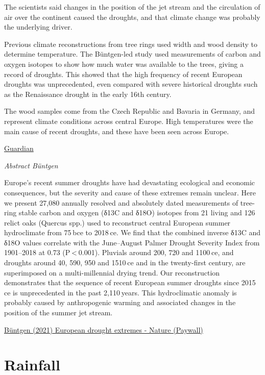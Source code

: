 \documentclass[
]{book}
\begin{document}
The scientists said changes in the position of the jet stream and the circulation of air over the continent caused the droughts, and that climate change was probably the underlying driver.

Previous climate reconstructions from tree rings used width and wood density to determine temperature. The Büntgen-led study used measurements of carbon and oxygen isotopes to show how much water was available to the trees, giving a record of droughts. This showed that the high frequency of recent European droughts was unprecedented, even compared with severe historical droughts such as the Renaissance drought in the early 16th century.

The wood samples come from the Czech Republic and Bavaria in Germany, and represent climate conditions across central Europe. High temperatures were the main cause of recent droughts, and these have been seen across Europe.

\href{https://www.theguardian.com/environment/2021/mar/15/climate-crisis-recent-european-droughts-worst-in-2000-years}{Guardian}

\emph{Abstract Büntgen}

Europe's recent summer droughts have had devastating ecological and economic consequences, but the severity and cause of these extremes remain unclear. Here we present 27,080 annually resolved and absolutely dated measurements of tree-ring stable carbon and oxygen (δ13C and δ18O) isotopes from 21 living and 126 relict oaks (Quercus spp.) used to reconstruct central European summer hydroclimate from 75 bce to 2018 ce. We find that the combined inverse δ13C and δ18O values correlate with the June--August Palmer Drought Severity Index from 1901--2018 at 0.73 (P \textless{} 0.001). Pluvials around 200, 720 and 1100 ce, and droughts around 40, 590, 950 and 1510 ce and in the twenty-first century, are superimposed on a multi-millennial drying trend. Our reconstruction demonstrates that the sequence of recent European summer droughts since 2015 ce is unprecedented in the past 2,110 years. This hydroclimatic anomaly is probably caused by anthropogenic warming and associated changes in the position of the summer jet stream.

\href{https://www.nature.com/articles/s41561-021-00698-0}{Büntgen (2021) European drought extremes - Nature (Paywall)}

\hypertarget{rainfall}{%
\chapter{Rainfall}\label{rainfall}}
\end{document}
